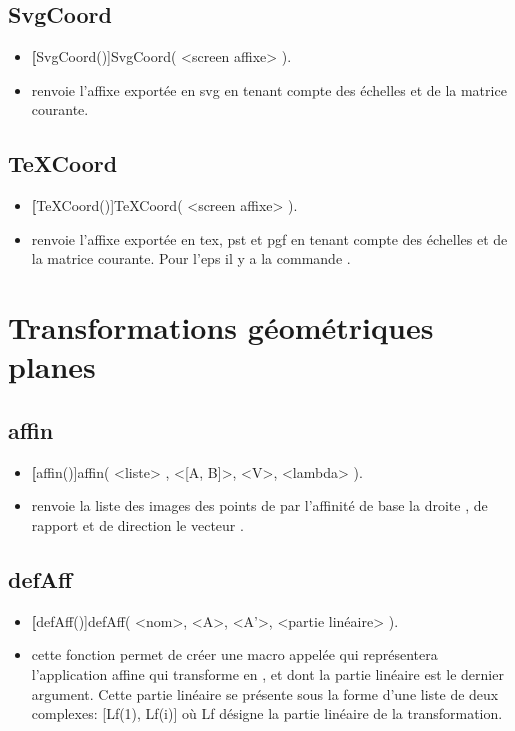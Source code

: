 \subsection{SvgCoord}\label{macSvgCoord}
\begin{itemize}
 \item \util \textbf[SvgCoord()]{SvgCoord( <screen affixe> )}.
 \item \desc renvoie l'affixe exportée en svg en tenant compte des échelles et de la matrice courante.
\end{itemize}

\subsection{TeXCoord}\label{macTeXCoord}
\begin{itemize}
 \item \util \textbf[TeXCoord()]{TeXCoord( <screen affixe> )}.
 \item \desc renvoie l'affixe exportée en tex, pst et pgf en tenant compte des échelles et de la matrice courante. Pour l'eps il y a la commande .
\end{itemize}


\section{Transformations géométriques planes}

\subsection{affin}
\begin{itemize}
 \item \util \textbf[affin()]{affin( <liste> , <[A, B]>, <V>, <lambda> )}.
 \item \desc renvoie la liste des images des points de  par l'affinité de base la droite , de rapport  et de direction le vecteur .
\end{itemize}

\subsection{defAff}
\begin{itemize}
 \item \util \textbf[defAff()]{defAff( <nom>, <A>, <A'>, <partie linéaire> )}.
 \item \desc cette fonction permet de créer une macro appelée  qui représentera l'application affine qui transforme  en , et dont la partie linéaire est le dernier argument. Cette partie linéaire se présente sous la forme d'une liste de deux complexes: [Lf(1), Lf(i)] où Lf désigne la partie linéaire de la transformation.
\end{itemize}


